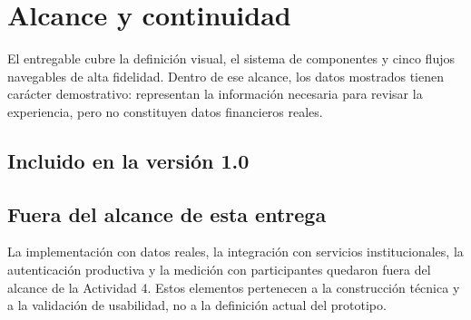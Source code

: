 \section{Alcance y continuidad}

El entregable cubre la definición visual, el sistema de componentes y cinco flujos navegables
de alta fidelidad. Dentro de ese alcance, los datos mostrados tienen carácter demostrativo:
representan la información necesaria para revisar la experiencia, pero no constituyen datos
financieros reales.

\subsection{Incluido en la versión 1.0}

\begin{uxlist}
\end{uxlist}

\subsection{Fuera del alcance de esta entrega}

La implementación con datos reales, la integración con servicios institucionales, la
autenticación productiva y la medición con participantes quedaron fuera del alcance de la
Actividad 4. Estos elementos pertenecen a la construcción técnica y a la validación de
usabilidad, no a la definición actual del prototipo.
